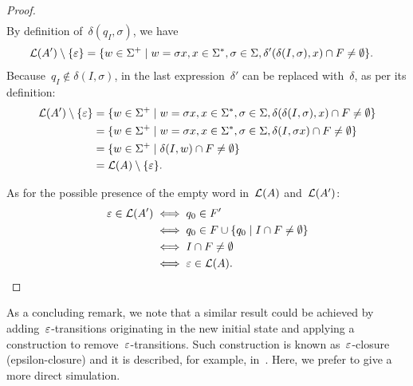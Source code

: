 \begin{proof}
\begin{align*}
	\end{align*}
	By definition of~$\delta(q_I,\sigma)$, we have
	\begin{align*}
		\mathcal L(A')\setminus\{\varepsilon\} & = \{w\in\Sigma^+\mid w=\sigma x, x\in\Sigma^*,\sigma\in\Sigma,\delta'(\delta(I,\sigma),x)\cap F\ne\emptyset\} \text.
	\end{align*}
	Because~$q_I\notin\delta(I,\sigma)$, in the last expression~$\delta'$ can be replaced with~$\delta$, as per its definition:
	\begin{align*}
		\mathcal L(A')\setminus\{\varepsilon\} & = \{w\in\Sigma^+\mid w=\sigma x, x\in\Sigma^*,\sigma\in\Sigma,\delta(\delta(I,\sigma),x)\cap F\ne\emptyset\} \\
		                                      & = \{w\in\Sigma^+\mid w=\sigma x, x\in\Sigma^*,\sigma\in\Sigma,\delta(I,\sigma x)\cap F\ne\emptyset\}         \\
		                                      & = \{w\in\Sigma^+\mid \delta(I,w)\cap F\ne\emptyset\}                                                            \\
		                                      & = \mathcal L(A)\setminus\{\varepsilon\} \text.
	\end{align*}

	As for the possible presence of the empty word in~$\mathcal L(A)$ and~$\mathcal L(A')$:
	\begin{align*}
		\varepsilon\in\mathcal L(A') & \iff q_0\in F'                                     \\
		                          & \iff q_0\in F\cup\{q_0\mid I\cap F\ne\emptyset\} \\
		                          & \iff I\cap F\ne\emptyset                           \\
		                          & \iff \varepsilon\in\mathcal L(A) \text. \qedhere
	\end{align*}
\end{proof}
As a concluding remark, we note that a similar result could be achieved by adding~$\varepsilon$-transitions originating in the new initial state and applying a construction to remove~$\varepsilon$-transitions.
Such construction is known as~$\varepsilon$-closure (epsilon-closure) and it is described, for example, in~\cite[Theorem 2.2]{HopUll79}.
Here, we prefer to give a more direct simulation.



